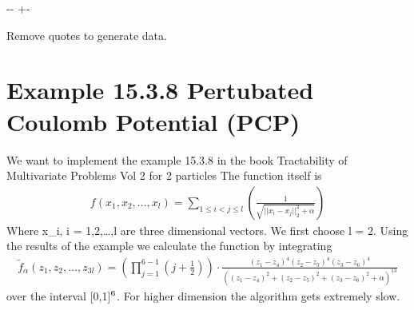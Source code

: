 \documentclass[letterpaper,10pt,english]{sphinxmanual}
\newlength\nbsphinxcodecellspacing
\begin{document}
{

\kern-\sphinxverbatimsmallskipamount\kern-\baselineskip
\kern+\FrameHeightAdjust\kern-\fboxrule
\vspace{\nbsphinxcodecellspacing}

\begin{sphinxVerbatim}[commandchars=\\\{\}]
Remove quotes to generate data.
\end{sphinxVerbatim}
}

{
\begin{sphinxVerbatim}[commandchars=\\\{\}]
\llap{\color{nbsphinxin}[ ]:\,\hspace{\fboxrule}\hspace{\fboxsep}}
\end{sphinxVerbatim}
}


\chapter{Example 15.3.8 Pertubated Coulomb Potential (PCP)}
\label{\detokenize{examples/Pertubated_Coulomb_Potential:Example-15.3.8-Pertubated-Coulomb-Potential-(PCP)}}\label{\detokenize{examples/Pertubated_Coulomb_Potential::doc}}
We want to implement the example 15.3.8 in the book Tractability of Multivariate Problems Vol 2 for 2 particles The function itself is
\begin{equation*}
\begin{split}f(x_1,x_2,\dots,x_l) = \sum_{1\leq i < j \leq l}\left(\frac{1}{\sqrt{||x_i-x_j||^{2}_{2}+\alpha}}\right)\end{split}
\end{equation*}
Where x\_i, i = 1,2,…,l are three dimensional vectors. We first choose l = 2. Using the results of the example we calculate the function by integrating
\begin{equation*}
\begin{split}\tilde{f}_{\alpha}(z_1, z_2, \dots, z_{3l})=\left(\prod^{6-1}_{j = 1}\left(j+\frac{1}{2}\right)\right) \cdot \frac{(z_1-z_4)^4(z_2-z_5)^4(z_3-z_6)^4}{((z_1-z_4)^2+(z_2-z_5)^2+(z_3-z_6)^2+\alpha)^{13}}\end{split}
\end{equation*}
over the interval {[}0,1{]}\(\sp{\text{6}}\). For higher dimension the algorithm gets extremely slow.
\end{document}
